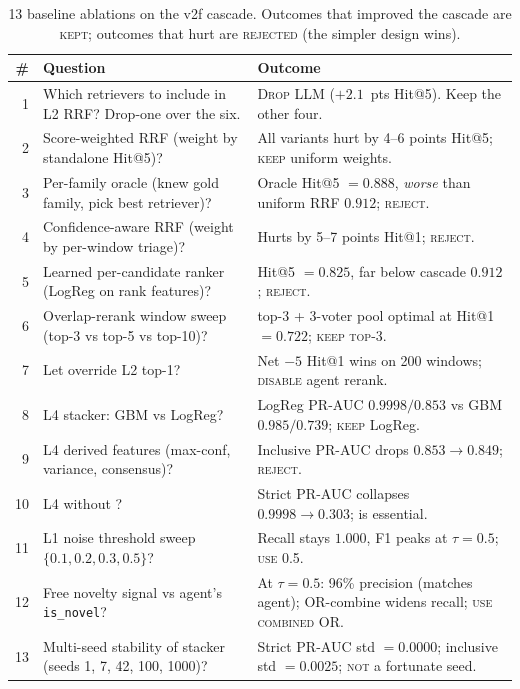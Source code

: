 \begin{table}[h]
\centering
\caption{13 baseline ablations on the v2f cascade. Outcomes that improved the cascade are \textsc{kept}; outcomes that hurt are \textsc{rejected} (the simpler design wins).}
\label{tab:baseline-ablations}
\small
\begin{tabularx}{\linewidth}{r X l}
\toprule
\# & Question & Outcome \\
\midrule
1 & Which retrievers to include in L2 RRF? Drop-one over the six. & \textsc{Drop} \hrrf{} LLM ($+2.1$~pts Hit@5). Keep the other four. \\
2 & Score-weighted RRF (weight by standalone Hit@5)? & All variants hurt by 4--6 points Hit@5; \textsc{keep} uniform weights. \\
3 & Per-family oracle (knew gold family, pick best retriever)? & Oracle Hit@5 $= 0.888$, \emph{worse} than uniform RRF $0.912$; \textsc{reject}. \\
4 & Confidence-aware RRF (weight by per-window triage)? & Hurts by 5--7 points Hit@1; \textsc{reject}. \\
5 & Learned per-candidate ranker (LogReg on rank features)? & Hit@5 $= 0.825$, far below cascade $0.912$; \textsc{reject}. \\
6 & Overlap-rerank window sweep (top-3 vs top-5 vs top-10)? & top-3 + 3-voter pool optimal at Hit@1 $= 0.722$; \textsc{keep top-3}. \\
7 & Let \agent{} override L2 top-1? & Net $-5$ Hit@1 wins on 200 windows; \textsc{disable} agent rerank. \\
8 & L4 stacker: GBM vs LogReg? & LogReg PR-AUC $0.9998 / 0.853$ vs GBM $0.985 / 0.739$; \textsc{keep} LogReg. \\
9 & L4 derived features (max-conf, variance, consensus)? & Inclusive PR-AUC drops $0.853 \to 0.849$; \textsc{reject}. \\
10 & L4 without \hgb{}? & Strict PR-AUC collapses $0.9998 \to 0.303$; \hgb{} is essential. \\
11 & L1 noise threshold sweep $\{0.1, 0.2, 0.3, 0.5\}$? & Recall stays $1.000$, F1 peaks at $\tau = 0.5$; \textsc{use} 0.5. \\
12 & Free novelty signal vs agent's \texttt{is\_novel}? & At $\tau = 0.5$: 96\% precision (matches agent); OR-combine widens recall; \textsc{use combined OR}. \\
13 & Multi-seed stability of stacker (seeds 1, 7, 42, 100, 1000)? & Strict PR-AUC std $= 0.0000$; inclusive std $= 0.0025$; \textsc{not} a fortunate seed. \\
\bottomrule
\end{tabularx}
\end{table}

